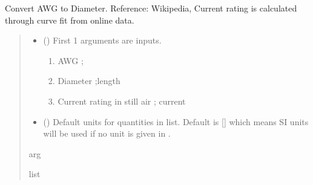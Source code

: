 \documentclass[letterpaper,10pt,english]{sphinxmanual}
\begin{document}
\begin{fulllineitems}
\label{\detokenize{components:components.AWG2Dia}}
\pysigstartsignatures
{}
\pysigstopsignatures
\sphinxAtStartPar
Convert AWG to Diameter.
Reference:  Wikipedia, Current rating is calculated through curve fit from online data.
\begin{quote}\begin{description}
\begin{itemize}
\item {} 
\sphinxAtStartPar
{} () \textendash{} 
\sphinxAtStartPar
First 1 arguments are inputs.
\begin{enumerate}
%
\item {} 
\sphinxAtStartPar
AWG ;

\item {} 
\sphinxAtStartPar
Diameter ;length

\item {} 
\sphinxAtStartPar
Current rating in still air ; current

\end{enumerate}


\item {} 
\sphinxAtStartPar
{} (\sphinxstyleliteralemphasis{\sphinxupquote{, }}) \textendash{} Default units for quantities in  list. Default is {[}{]} which means SI units will be used if no unit is given in .

\end{itemize}

\sphinxAtStartPar
arg

\sphinxAtStartPar
list

\end{description}\end{quote}

\end{fulllineitems}

\end{document}
